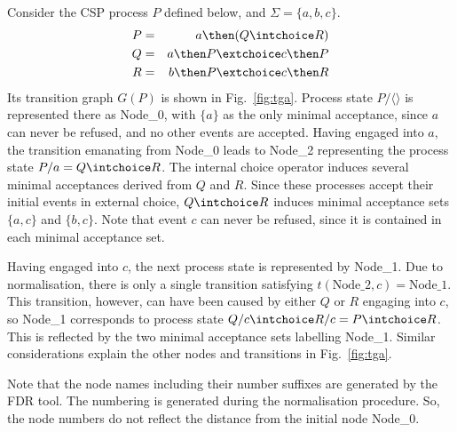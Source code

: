 \begin{example}\label{ex:a}
Consider the CSP process $P$ defined below, and $\Sigma = \{a,b,c\}$.
\begin{eqnarray*}
P & = & a \then (Q\intchoice R)
\\
Q & = & a \then P \extchoice c \then P
\\
R & = & b \then P \extchoice c \then R
\end{eqnarray*}
Its transition graph $G(P)$ is shown in Fig.~\ref{fig:tga}. Process state
$P/\langle\rangle$ is represented there as Node\_0, with $\{ a\}$ as the
only minimal acceptance, since $a$ can never be refused, and no other events are
accepted. Having engaged into $a$, the transition emanating from Node\_0
leads to Node\_2 representing  the process state $P/a = Q\intchoice R$. The
internal choice operator induces several minimal acceptances derived from $Q$ and
$R$. Since these processes accept their initial events in external choice,
$Q\intchoice R$ induces minimal acceptance sets $\{a,c\}$ and
$\{b,c\}$. Note that event $c$ can never be refused, since it is contained in each minimal acceptance set.

Having engaged into $c$, the next process state is represented by Node\_1.
Due to normalisation, there is only a single transition satisfying
$t(\text{Node\_2},c) = \text{Node\_1}$. This transition, however, can have
been caused by either $Q$ or $R$ engaging into $c$, so Node\_1 corresponds to
process state $Q/c \intchoice R/c = P \intchoice R$. This is reflected by the
two minimal acceptance sets labelling Node\_1.
Similar considerations explain the other nodes and transitions in
Fig.~\ref{fig:tga}.

Note that the node names including their number suffixes are generated by the
FDR tool. The numbering is generated during the normalisation procedure. So,
the node numbers do not reflect the distance from the initial node Node\_0.
\xbox
\end{example}

